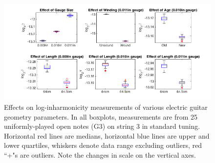 \documentclass[12pt]{cmuthesis}
\begin{document}
\begin{figure}[!htbp] 
\centering
\includegraphics[scale=0.60]{eg-params}
\caption{Effects on log-inharmonicity measurements of various electric guitar geometry parameters. In all boxplots, measurements are from 25 uniformly-played open notes (G3) on string 3 in standard tuning. Horizontal red lines are medians, horizontal blue lines are upper and lower quartiles, whiskers denote data range excluding outliers, red ``+"s are outliers. Note the changes in scale on the vertical axes.}
\label{fig:eg-params}
\end{figure} 

\end{document}
